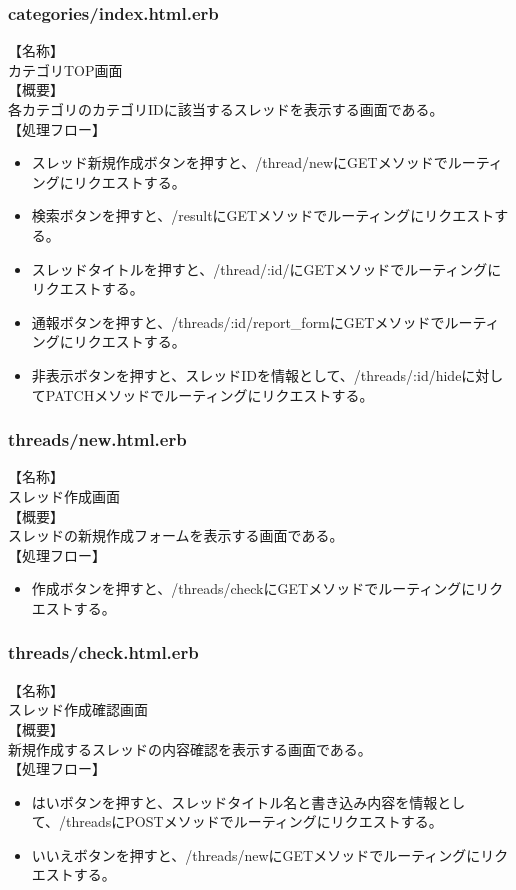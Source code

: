 \documentclass[a4j]{jarticle}
\begin{document}
\subsubsection{categories/index.html.erb}
\noindent
【名称】\\
カテゴリTOP画面\\
【概要】\\
各カテゴリのカテゴリIDに該当するスレッドを表示する画面である。\\
【処理フロー】
\begin{itemize}
  \item スレッド新規作成ボタンを押すと、/thread/newにGETメソッドでルーティングにリクエストする。
  \item 検索ボタンを押すと、/resultにGETメソッドでルーティングにリクエストする。
  \item スレッドタイトルを押すと、/thread/:id/にGETメソッドでルーティングにリクエストする。
  \item 通報ボタンを押すと、/threads/:id/report\_formにGETメソッドでルーティングにリクエストする。
  \item 非表示ボタンを押すと、スレッドIDを情報として、/threads/:id/hideに対してPATCHメソッドでルーティングにリクエストする。
\end{itemize}

\subsubsection{threads/new.html.erb}
\noindent
【名称】\\
スレッド作成画面\\
【概要】\\
スレッドの新規作成フォームを表示する画面である。\\
【処理フロー】
\begin{itemize}
  \item 作成ボタンを押すと、/threads/checkにGETメソッドでルーティングにリクエストする。
\end{itemize}

\subsubsection{threads/check.html.erb}
\noindent
【名称】\\
スレッド作成確認画面\\
【概要】\\
新規作成するスレッドの内容確認を表示する画面である。\\
【処理フロー】
\begin{itemize}
  \item はいボタンを押すと、スレッドタイトル名と書き込み内容を情報として、/threadsにPOSTメソッドでルーティングにリクエストする。
  \item いいえボタンを押すと、/threads/newにGETメソッドでルーティングにリクエストする。
\end{itemize}
\end{document}
